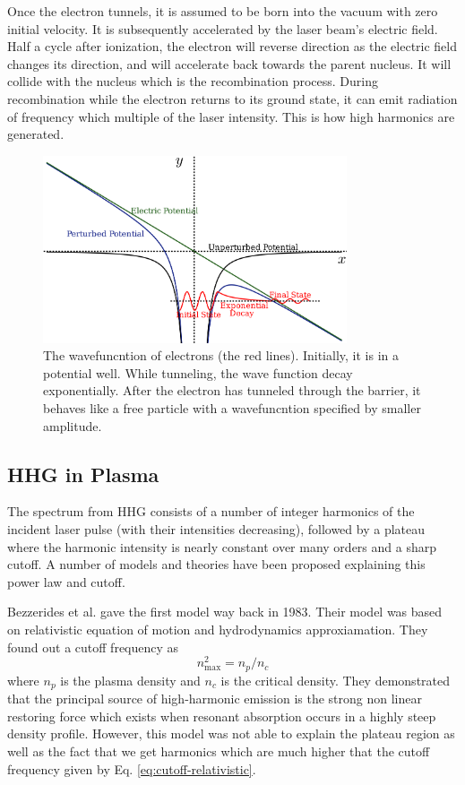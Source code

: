 \documentclass[12pt]{article}
\begin{document}
Once the electron tunnels, it is assumed to be born into the vacuum with zero initial velocity. It is subsequently accelerated by the laser beam's electric field. Half a cycle after ionization, the electron will reverse direction as the electric field changes its direction, and will accelerate back towards the parent nucleus. It will collide with the nucleus which is the recombination process. During recombination while the electron returns to its ground state, it can emit radiation of frequency which multiple of the laser intensity. This is how high harmonics are generated.

\begin{figure}[h]
    \centering
    \includegraphics[width=0.8\textwidth]{images/three_step_two.png}
    \caption{The wavefuncntion of electrons (the red lines). Initially, it is in a potential well. While tunneling, the wave function decay exponentially. After the electron has tunneled through the barrier, it behaves like a free particle with a wavefuncntion specified by smaller amplitude.}
    \label{fig:3-step-2}
\end{figure}

\subsection{HHG in Plasma}
The spectrum from HHG consists of a number of integer harmonics of the incident laser pulse (with their intensities decreasing), followed by a plateau where the harmonic intensity is nearly constant over many orders and a sharp cutoff. A number of models and theories have been proposed explaining this power law and cutoff.

Bezzerides et al. \cite{hhg-relativistic} gave the first model way back in 1983. Their model was based on relativistic equation of motion and hydrodynamics approxiamation. They found out a cutoff frequency as
\begin{equation}
    \label{eq:cutoff-relativistic}
    n_{\max}^2 = n_p/n_c
\end{equation}
where $n_p$ is the plasma density and $n_c$ is the critical density. They demonstrated that the principal source of high-harmonic emission is the strong non linear restoring force which exists when resonant absorption occurs in a highly steep density profile. However, this model was not able to explain the plateau region as well as the fact that we get harmonics which are much higher that the cutoff frequency given by Eq. \ref{eq:cutoff-relativistic}.
\end{document}
